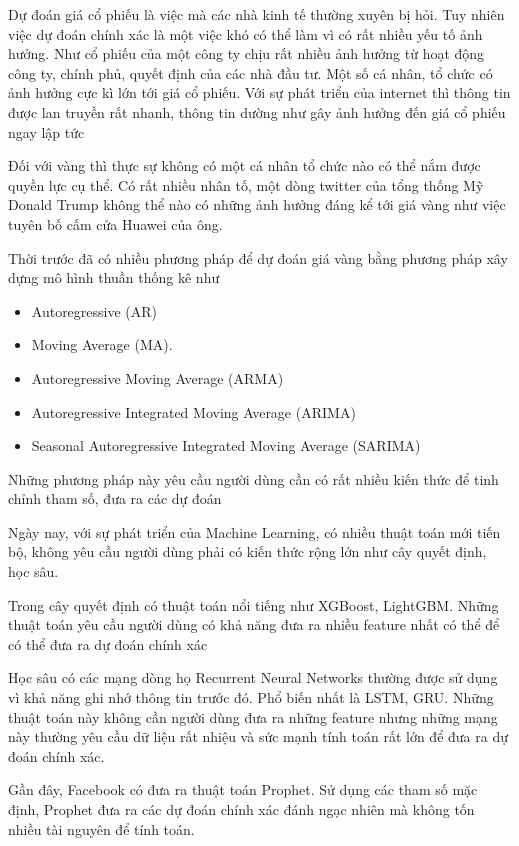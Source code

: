 Dự đoán giá cổ phiếu là việc mà các nhà kinh tế thường xuyên bị hỏi.
Tuy nhiên việc dự đoán chính xác là một việc khó có thể làm vì có rất nhiều yếu tố ảnh hưởng.
Như cổ phiếu của một công ty chịu rất nhiều ảnh hưởng từ hoạt động công ty, chính phủ, quyết định của các nhà đầu tư.
Một số cá nhân, tổ chức có ảnh hưởng cực kì lớn tới giá cổ phiếu.
Với sự phát triển của internet thì thông tin được lan truyền rất nhanh, thông tin dường như gây ảnh hưởng đến giá cổ phiếu ngay lập tức

Đối với vàng thì thực sự không có một cá nhân tổ chức nào có thể nắm được quyền lực cụ thể.
Có rất nhiều nhân tố, một dòng twitter của tổng thống Mỹ Donald Trump không thể nào có những ảnh hưởng đáng kể tới giá vàng như việc tuyên bố cấm cửa Huawei của ông.

Thời trước đã có nhiều phương pháp để dự đoán giá vàng bằng phương pháp xây dựng mô hình thuần thống kê như
\begin{itemize}
    \item Autoregressive (AR)
    \item Moving Average (MA).
    \item Autoregressive Moving Average (ARMA)
    \item Autoregressive Integrated Moving Average (ARIMA)
    \item Seasonal Autoregressive Integrated Moving Average (SARIMA)
\end{itemize}
Những phương pháp này yêu cầu người dùng cần có rất nhiều kiến thức để tinh chỉnh tham số, đưa ra các dự đoán

Ngày nay, với sự phát triển của Machine Learning, có nhiều thuật toán mới tiến bộ, không yêu cầu người dùng phải
có kiến thức rộng lớn như cây quyết định, học sâu.

Trong cây quyết định có thuật toán nổi tiếng như XGBoost, LightGBM. Những thuật toán yêu cầu người dùng có khả năng đưa ra nhiều feature nhất có thể
để có thể đưa ra dự đoán chính xác

Học sâu có các mạng dòng họ Recurrent Neural Networks thường được sử dụng vì khả năng ghi nhớ thông tin trước đó. Phổ biến nhất là LSTM, GRU. Những thuật toán
này không cần người dùng đưa ra những feature nhưng những mạng này thường yêu cầu dữ liệu rất nhiệu và sức mạnh tính toán rất lớn để đưa ra dự đoán chính xác.

Gần đây, Facebook có đưa ra thuật toán Prophet. Sử dụng các tham số mặc định, Prophet đưa ra các dự đoán chính xác đánh ngạc nhiên mà không
tốn nhiều tài nguyên để tính toán.

